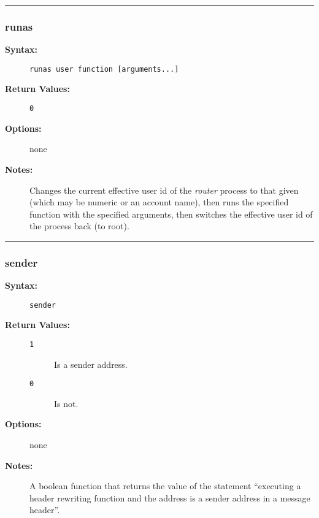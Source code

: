 \hrule
\subsubsection{runas}

\begin{description}
\item[{\bf Syntax:}] \mbox{}

{\tt runas user function [arguments...]}

\item[{\bf Return Values:}] \mbox{}

\begin{description}
\item[{\tt 0}] \mbox{}



\end{description}


\item[{\bf Options:}] \mbox{}

none  

\item[{\bf Notes:}] \mbox{}

Changes the current effective user id 
of the {\em router\/} process to that given (which may be 
numeric or an account name), then runs the specified function 
with the specified arguments, then switches the effective 
user id of the process back (to root). 

\end{description}


\hrule
\subsubsection{sender}

\begin{description}
\item[{\bf Syntax:}] \mbox{}

{\tt sender}

\item[{\bf Return Values:}] \mbox{}

\begin{description}
\item[{\tt 1}] \mbox{}

Is a sender address.

\item[{\tt 0}] \mbox{}

Is not.

\end{description}


\item[{\bf Options:}] \mbox{}

none  

\item[{\bf Notes:}] \mbox{}

A boolean function that returns the value of 
the statement ``executing a header rewriting function and the address 
is a sender address in a message header''. 

\end{description}


